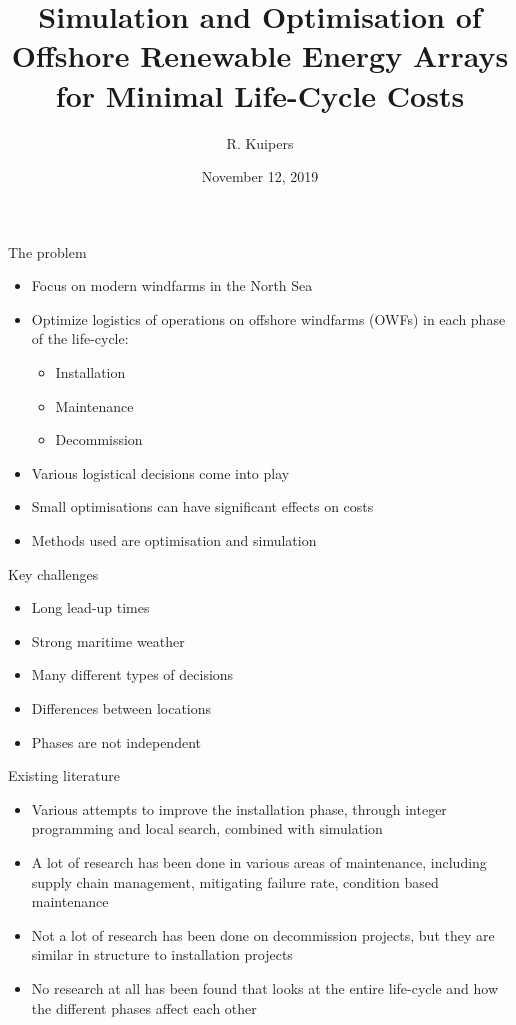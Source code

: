 \documentclass{beamer}
\title[Logistical Optimisation for Offshore Windfarms]{Simulation and Optimisation of Offshore Renewable Energy Arrays for Minimal Life-Cycle Costs}
\author{R. Kuipers}
\date{November 12, 2019}
\begin{document}
\begin{frame}
  \titlepage
\end{frame}

\begin{frame}{The problem}
  \begin{itemize}
  	\item Focus on modern windfarms in the North Sea
  	\item Optimize logistics of operations on offshore windfarms (OWFs) in each phase of the life-cycle:
  	\begin{itemize}
  		\item Installation
  		\item Maintenance
  		\item Decommission
  	\end{itemize}
  	\item Various logistical decisions come into play
  	\item Small optimisations can have significant effects on costs
  	\item Methods used are optimisation and simulation
  \end{itemize}
\end{frame}


\begin{frame}{Key challenges}
  \begin{itemize}
  	\item Long lead-up times
  	\item Strong maritime weather
  	\item Many different types of decisions
  	\item Differences between locations
  	\item Phases are not independent
  \end{itemize}
\end{frame}


\begin{frame}{Existing literature}
   \begin{itemize}
  	\item Various attempts to improve the installation phase, through integer programming and local search, combined with simulation
  	\item A lot of research has been done in various areas of maintenance, including supply chain management, mitigating failure rate, condition based maintenance
  	\item Not a lot of research has been done on decommission projects, but they are similar in structure to installation projects
  	\item No research at all has been found that looks at the entire life-cycle and how the different phases affect each other
  \end{itemize}
\end{frame}
\end{document}
